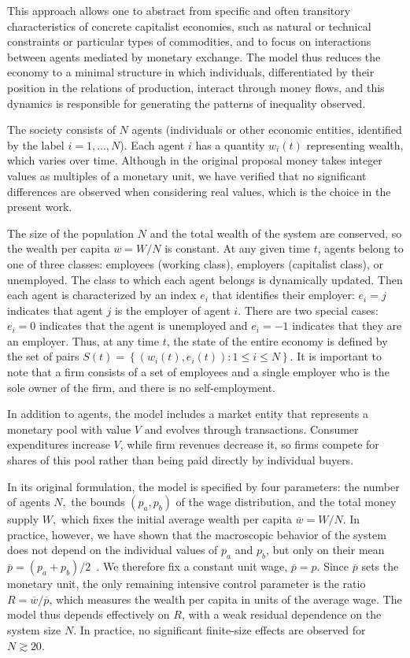 This approach allows one to abstract from specific and often transitory characteristics of concrete capitalist economies, such as natural or technical constraints or particular types of commodities, and to focus on interactions between agents mediated by monetary exchange. The model thus reduces the economy to a minimal structure in which individuals, differentiated by their position in the relations of production, interact through money flows, and this dynamics is responsible for generating the patterns of inequality observed. 

The society consists of $N$ agents (individuals or other economic entities, identified by the label $i=1,\dots,N$). Each agent $i$ has a quantity $w_{i}(t)$ representing wealth, which varies over time. Although in the original proposal money takes integer values as multiples of a monetary unit, we have verified that no significant differences are observed when considering real values, which is the choice in the present work.

The size of the population $N$ and the total wealth of the system are conserved, so the wealth per capita $\overline{w}=W/N$ is constant. At any given time $t$, agents belong to one of three classes: employees (working class), employers (capitalist class), or unemployed. The class to which each agent belongs is dynamically updated. Then each agent is characterized by an index $e_{i}$ that identifies their employer: $e_{i}=j$ indicates that agent $j$ is the employer of agent $i$. There are two special cases: $e_{i}=0$ indicates that the agent is unemployed and $e_{i}=-1$ indicates that they are an employer. Thus, at any time $t$, the state of the entire economy is defined by the set of pairs $S(t)=\left\{ \left(w_{i}(t),e_{i}(t)\right):1\leq i\leq N\right\} $. It is important to note that a firm consists of a set of employees and a single employer who is the sole owner of the firm, and there is no self-employment.

In addition to agents, the model includes a market entity that represents a monetary pool with value $V$ and evolves through transactions. Consumer expenditures increase $V$, while firm revenues decrease it, so firms compete for shares of this pool rather than being paid directly by individual buyers.

In its original formulation, the model is specified by four parameters: the number of agents $N,$ the bounds $(p_{a},p_{b})$ of the wage distribution, and the total money supply $W,$ which fixes the initial average wealth per capita $\overline{w}=W/N$. In practice, however, we have shown that the macroscopic behavior of the system does not depend on the individual values of $p_{a}$ and $p_{b}$, but only on their mean $\overline{p}=(p_{a}+p_{b})/2$~\cite{Borba2025}. We therefore fix a constant unit wage, $\overline{p}=p$. Since $\overline{p}$ sets the monetary unit, the only remaining intensive control parameter is the ratio $R=\overline{w}/\overline{p}$, which measures the wealth per capita in units of the average wage. The model thus depends effectively on $R$, with a weak residual dependence on the system size $N$. In practice, no significant finite-size effects are observed for $N\gtrsim20$.

